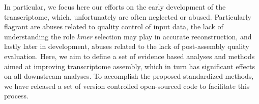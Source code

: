 In particular, we focus here our efforts on the early development of the transcriptome, which, unfortunately are often neglected or abused. Particularly flagrant are abuses related to quality control of input data, the lack of understanding the role \textit{kmer} selection may play in accurate reconstruction, and lastly later in development, abuses related to the lack of post-assembly quality evaluation. Here, we aim to define a set of evidence based analyses and methods aimed at improving transcriptome assembly, which in turn has significant effects on all downstream analyses. To accomplish the proposed standardized methods, we have released a set of version controlled open-sourced code to facilitate this process. 